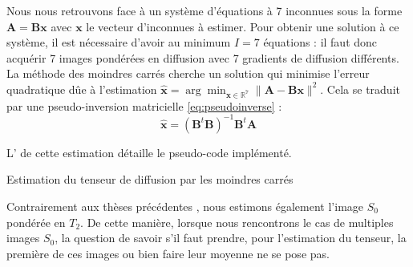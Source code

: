 Nous nous retrouvons face à un système d'équations à 7 inconnues
sous la forme $\mathbf{A} = \mathbf{B}\mathbf{x}$ avec $\mathbf{x}$ le vecteur d'inconnues à estimer.
Pour obtenir une solution à ce système, il est nécessaire d'avoir au minimum $I=7$ équations : 
il faut donc acquérir 7 images pondérées en diffusion avec 7 gradients de diffusion différents. 
La méthode des moindres carrés cherche un solution qui minimise l'erreur quadratique dûe à l'estimation
$\mathbf{\hat{x}} = \arg\min_{\mathbf{x} \in \mathbb{R}^{7}}{\|\mathbf{A} - \mathbf{B}\mathbf{x} \|^{2}}$.
Cela se traduit par une pseudo-inversion matricielle \eqref{eq:pseudoinverse} :
\begin{equation}
    \mathbf{\hat{x}} = (\mathbf{B}^{t}\mathbf{B})^{-1}\mathbf{B}^{t}\mathbf{A}
    \label{eq:pseudoinverse}
\end{equation}

L' de cette estimation détaille le pseudo-code implémenté.
\begin{center}
    \begin{minipage}[c]{0.95\textwidth}
	\begin{algorithm}[H]
	    \vspace*{0.5em}
	    \vspace*{1em}
	    \vspace*{1em}
	    \vspace*{0.5em}
	    \caption{\label{algo:estimation_tenseur}Estimation du tenseur de diffusion par les moindres carrés}
	\end{algorithm}
    \end{minipage}
\end{center}

Contrairement aux thèses précédentes \cite{Boisgontier_PhD, Grigis_PhD}, nous estimons également l'image $S_0$ pondérée en $T_2$.
De cette manière, lorsque nous rencontrons le cas de multiples images $S_0$, 
la question de savoir s'il faut prendre, pour l'estimation du tenseur, la première de ces images
ou bien faire leur moyenne ne se pose pas.

